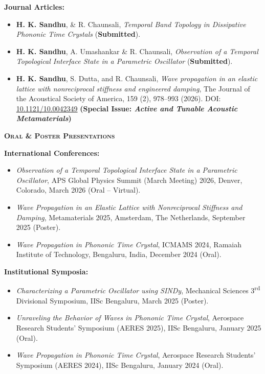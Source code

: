 \documentclass[11pt]{article}
\renewcommand{\section}[1]{%
  \par\vspace{12pt}%
  {\centerline{\large\bfseries\scshape #1}}\par\vspace{-6pt}%
  \noindent{\color{black!20}\rule{\linewidth}{1pt}}\par\vspace{5pt}%
}
\newenvironment{list2}{\begin{itemize}[leftmargin=0.2in,itemsep=0pt,topsep=2pt,parsep=0pt]}{\end{itemize}}
\begin{document}
\textbf{Journal Articles:}
\vspace{4pt}
\begin{list2}
\item[3.] \textbf{H. K. Sandhu}, \& R. Chaunsali, \textit{Temporal Band Topology in Dissipative Phononic Time Crystals} (\textbf{Submitted}).

\item[2.] \textbf{H. K. Sandhu}, A. Umashankar \& R. Chaunsali, \textit{Observation of a Temporal Topological Interface State in a Parametric Oscillator} (\textbf{Submitted}).

\item[1.] \textbf{H. K. Sandhu}, S. Dutta, and R. Chaunsali, \textit{Wave propagation in an elastic lattice with nonreciprocal stiffness and engineered damping}, The Journal of the Acoustical Society of America, 159 (2), 978--993 (2026). DOI: \href{https://doi.org/10.1121/10.0042349}{10.1121/10.0042349} \textbf{(Special Issue: \textit{Active and Tunable Acoustic Metamaterials})}
\end{list2}
\vspace{6pt}

\section{Oral \& Poster Presentations}

\textbf{International Conferences:}
\vspace{4pt}
\begin{list2}
\item[3.] \textit{Observation of a Temporal Topological Interface State in a Parametric Oscillator}, APS Global Physics Summit (March Meeting) 2026, Denver, Colorado, March 2026 (Oral -- Virtual).
\item[2.] \textit{Wave Propagation in an Elastic Lattice with Nonreciprocal Stiffness and Damping}, Metamaterials 2025, Amsterdam, The Netherlands, September 2025 (Poster).
\item[1.] \textit{Wave Propagation in Phononic Time Crystal}, ICMAMS 2024, Ramaiah Institute of Technology, Bengaluru, India, December 2024 (Oral).
\end{list2}

\vspace{6pt}
\textbf{Institutional Symposia:}
\vspace{4pt}
\begin{list2}
\item[3.] \textit{Characterizing a Parametric Oscillator using SINDy}, Mechanical Sciences 3\textsuperscript{rd} Divisional Symposium, IISc Bengaluru, March 2025 (Poster).
\item[2.] \textit{Unraveling the Behavior of Waves in Phononic Time Crystal}, Aerospace Research Students' Symposium (AERES 2025), IISc Bengaluru, January 2025 (Oral).
\item[1.] \textit{Wave Propagation in Phononic Time Crystal}, Aerospace Research Students' Symposium (AERES 2024), IISc Bengaluru, January 2024 (Oral).
\end{list2}
\end{document}
